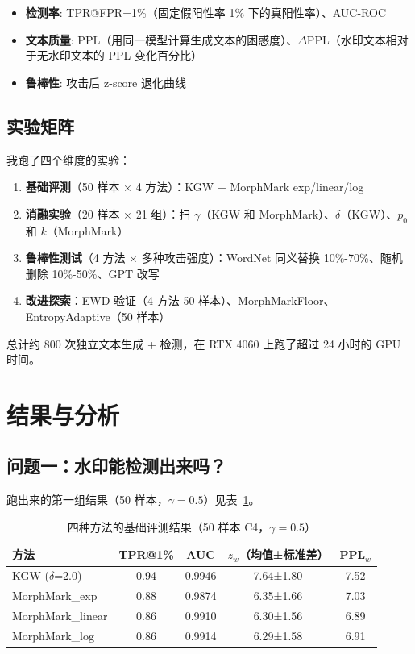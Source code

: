 \documentclass[11pt,a4paper]{article}
\begin{document}
\begin{itemize}[nosep]
  \item \textbf{检测率}: TPR@FPR=1\%（固定假阳性率 1\% 下的真阳性率）、AUC-ROC
  \item \textbf{文本质量}: PPL（用同一模型计算生成文本的困惑度）、$\Delta$PPL（水印文本相对于无水印文本的 PPL 变化百分比）
  \item \textbf{鲁棒性}: 攻击后 z-score 退化曲线
\end{itemize}

\subsection{实验矩阵}

我跑了四个维度的实验：

\begin{enumerate}[nosep]
  \item \textbf{基础评测}（50 样本 × 4 方法）：KGW + MorphMark exp/linear/log
  \item \textbf{消融实验}（20 样本 × 21 组）：扫 $\gamma$（KGW 和 MorphMark）、$\delta$（KGW）、$p_0$ 和 $k$（MorphMark）
  \item \textbf{鲁棒性测试}（4 方法 × 多种攻击强度）：WordNet 同义替换 10\%-70\%、随机删除 10\%-50\%、GPT 改写
  \item \textbf{改进探索}：EWD 验证（4 方法 50 样本）、MorphMarkFloor、EntropyAdaptive（50 样本）
\end{enumerate}

总计约 800 次独立文本生成 + 检测，在 RTX 4060 上跑了超过 24 小时的 GPU 时间。

\section{结果与分析}

\subsection{问题一：水印能检测出来吗？}

跑出来的第一组结果（50 样本，$\gamma=0.5$）见表~\ref{tab:main}。

\begin{table}[H]
\centering
\caption{四种方法的基础评测结果（50 样本 C4，$\gamma=0.5$）}
\label{tab:main}
\begin{tabular}{@{}lcccc@{}}
\toprule
\textbf{方法} & \textbf{TPR@1\%} & \textbf{AUC} & \textbf{$z_w$（均值±标准差）} & \textbf{PPL$_w$} \\
\midrule
KGW ($\delta$=2.0) & 0.94 & 0.9946 & 7.64±1.80 & 7.52 \\
MorphMark\_exp & 0.88 & 0.9874 & 6.35±1.66 & 7.03 \\
MorphMark\_linear & 0.86 & 0.9910 & 6.30±1.56 & 6.89 \\
MorphMark\_log & 0.86 & 0.9914 & 6.29±1.58 & 6.91 \\
\bottomrule
\end{tabular}
\end{table}
\end{document}
